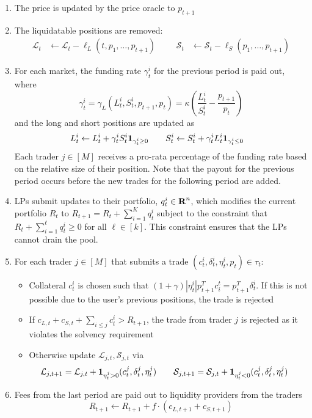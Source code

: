 \begin{enumerate}
    \item The price is updated by the price oracle to $p_{t+1}$
    \item The liquidatable positions are removed:
    \begin{align*}
    \mathcal{L}_{t} &\leftarrow \mathcal{L}_t - \ell_L(t, p_1, \ldots, p_{t+1}) &&&
    \mathcal{S}_t &\leftarrow \mathcal{S}_t - \ell_S(p_1, \ldots, p_{t+1})
    \end{align*}
    \item For each market, the funding rate $\gamma^i_{t}$ for the previous period is paid out, where
    \[
    \gamma^i_{t} = \gamma_L(L^i_t, S^i_t, p_{t+1}, p_t) = \kappa\left(\frac{L^i_t}{S^i_t} - \frac{p_{t+1}}{p_t}\right)
    \]
    and the long and short positions are updated as
    \begin{align*}
    L^i_t &\leftarrow L^i_t + \gamma^i_t S^i_t \mathbf 1_{\gamma^i_t \geq 0} &&&
    S^i_t &\leftarrow S^i_t + \gamma^i_t L^i_t \mathbf 1_{\gamma^i_t \leq 0}
    \end{align*}
    Each trader $j \in [M]$ receives a pro-rata percentage of the funding rate based on the relative size of their position.
    Note that the payout for the previous period occurs before the new trades for the following period are added.
    \item LPs submit updates to their portfolio, $q^i_t \in {\mbox{\bf R}}^n$, which modifies the current portfolio $R_t$ to $R_{t+1} = R_t + \sum_{i=1}^K q^i_t$ subject to the constraint that $R_t + \sum_{i=1}^{\ell} q^i_t \geq 0$ for all $\ell \in [k]$.
    This constraint ensures that the LPs cannot drain the pool.
    \item For each trader $j \in [M]$ that submits a trade $(c^i_t, \delta^i_t, \eta^i_t, p_t) \in \tau_t$:
    \begin{itemize}
        \item Collateral $c_t^i$ is chosen such that $(1+\gamma)|\eta_t^i| p_{t+1}^T c^t_i = p_{t+1}^T \delta_t^i$.
        If this is not possible due to the user's previous positions, the trade is rejected
        \item If $c_{L,t} + c_{S, t} + \sum_{i \leq j} c_t^i > R_{t+1}$, the trade from trader $j$ is rejected as it violates the solvency requirement
        \item Otherwise update $\mathcal{L}_{j, t}, \mathcal{S}_{j, t}$ via
        \begin{align*}
            \mathcal{L}_{j, t+1} &= \mathcal{L}_{j, t} + \mathbf 1_{\eta^j_t >0 } (c^j_t, \delta^j_t, \eta^j_t) &&&
            \mathcal{S}_{j, t+1} &= \mathcal{S}_{j, t} + \mathbf 1_{\eta^j_t < 0} (c^j_t, \delta^j_t, \eta^j_t)
        \end{align*}
    \end{itemize}
    \item Fees from the last period are paid out to liquidity providers from the traders
    \[
    R_{t+1} \leftarrow R_{t+1} + f\cdot(c_{L, t+1} + c_{S, t+1})
    \]
\end{enumerate}
